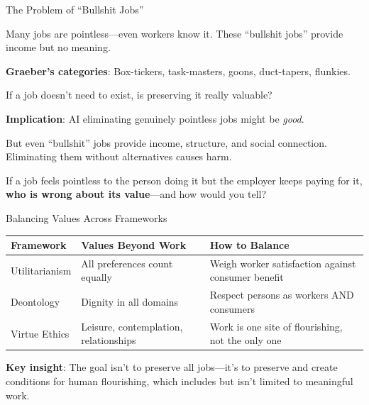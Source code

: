 ﻿\documentclass[aspectratio=169,11pt]{beamer}
\begin{document}
\begin{frame}[shrink=8]{The Problem of ``Bullshit Jobs''}
\begin{conceptbox}
\small
Many jobs are pointless---even workers know it. These ``bullshit jobs'' provide income but no meaning.
\end{conceptbox}

\vspace{0.2em}
\textbf{Graeber's categories}: Box-tickers, task-masters, goons, duct-tapers, flunkies.

\vspace{0.2em}
If a job doesn't need to exist, is preserving it really valuable?

\vspace{0.2em}
\textbf{Implication}: AI eliminating genuinely pointless jobs might be \emph{good}.

\vspace{0.2em}
\begin{objectionbox}[Objection]
\small
But even ``bullshit'' jobs provide income, structure, and social connection. Eliminating them without alternatives causes harm.
\end{objectionbox}

\begin{discussionbox}[Discussion]
If a job feels pointless to the person doing it but the employer keeps paying for it, \textbf{who is wrong about its value}---and how would you tell?
\end{discussionbox}
\end{frame}

\begin{frame}{Balancing Values Across Frameworks}
\begin{table}[h]
\centering
\scriptsize
\begin{tabular}{@{}p{2.5cm}p{4.5cm}p{4.5cm}@{}}
\toprule
\textbf{Framework} & \textbf{Values Beyond Work} & \textbf{How to Balance} \\
\midrule
Utilitarianism & All preferences count equally & Weigh worker satisfaction against consumer benefit \\
\addlinespace
Deontology & Dignity in all domains & Respect persons as workers AND consumers \\
\addlinespace
Virtue Ethics & Leisure, contemplation, relationships & Work is one site of flourishing, not the only one \\
\bottomrule
\end{tabular}
\end{table}

\vspace{0.2em}
\textbf{Key insight}: The goal isn't to preserve all jobs---it's to preserve and create conditions for human flourishing, which includes but isn't limited to meaningful work.
\end{frame}
\end{document}
